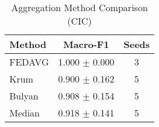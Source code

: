 \begin{table}[htbp]
\centering
\caption{Aggregation Method Comparison (CIC)}\label{tab:agg_cic}
\begin{tabular}{lcc}
\toprule
Method & Macro-F1 & Seeds \\
\midrule
FEDAVG & 1.000 $\pm$ 0.000 & 3 \\
Krum & 0.900 $\pm$ 0.162 & 5 \\
Bulyan & 0.908 $\pm$ 0.154 & 5 \\
Median & 0.918 $\pm$ 0.141 & 5 \\
\bottomrule
\end{tabular}
\end{table}
